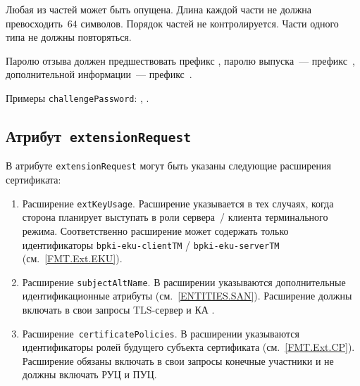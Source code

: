 Любая из частей может быть опущена. Длина каждой части не должна 
превосходить~$64$ символов. Порядок частей не контролируется.
Части одного типа не должны повторяться.

Паролю отзыва должен предшествовать префикс 
, паролю выпуска~--- префикс~,
дополнительной информации~--- префикс~.

Примеры \texttt{challengePassword}:
, .

\subsection{Атрибут~\texttt{extensionRequest}}\label{FMT.CSR.ER}

В атрибуте \texttt{extensionRequest} могут быть указаны следующие 
расширения сертификата:

\begin{enumerate}
\item 
Расширение \texttt{extKeyUsage}. Расширение указывается в тех случаях, 
когда сторона планирует выступать в роли сервера~/ клиента терминального 
режима. Соответственно расширение может содержать только идентификаторы  
\verb|bpki-eku-clientTM| / \verb|bpki-eku-serverTM| 
(см.~\ref{FMT.Ext.EKU}). 



\item 
Расширение \texttt{subjectAltName}. В расширении указываются 
дополнительные идентификационные атрибуты (см.~\ref{ENTITIES.SAN}). 
Расширение должны включать в свои запросы TLS-сервер и КА 
.


\item
Расширение~\texttt{certificatePolicies}. В расширении
указываются идентификаторы ролей будущего субъекта сертификата
(см.~\ref{FMT.Ext.CP}).
Расширение обязаны включать в свои запросы конечные участники 
и не должны включать РУЦ и ПУЦ.
\end{enumerate}
